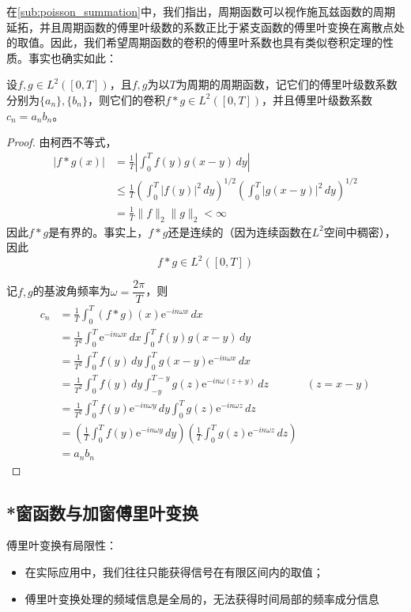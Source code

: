在\ref{sub:poisson_summation}中，我们指出，周期函数可以视作施瓦兹函数的周期延拓，并且周期函数的傅里叶级数的系数正比于紧支函数的傅里叶变换在离散点处的取值。因此，我们希望周期函数的卷积的傅里叶系数也具有类似卷积定理的性质。事实也确实如此：
\begin{theorem}[周期函数的卷积定理]
    设$f,g\in L^2([0,T])$，且$f,g$为以$T$为周期的周期函数，记它们的傅里叶级数系数分别为$\{a_n\},\{b_n\}$，则它们的卷积$f*g\in L^2([0,T])$，并且傅里叶级数系数$c_n=a_n b_n$。
\end{theorem}
\begin{proof}
    由柯西不等式，
    \begin{align*}
        |f*g(x)|&=\frac{1}{T}\left|\int_0^{T}f(y)g(x-y)\,dy\right|\\
        &\leq \frac{1}{T}\left(\int_0^{T}|f(y)|^2\,dy\right)^{1/2}\left(\int_0^{T}|g(x-y)|^2\,dy\right)^{1/2}\\
        &=\frac{1}{T}\|f\|_2\|g\|_2<\infty
    \end{align*}
    因此$f*g$是有界的。事实上，$f*g$还是连续的（因为连续函数在$L^2$空间中稠密），因此
    $$f*g\in L^2([0,T])$$

    记$f,g$的基波角频率为$\omega=\dfrac{2\pi}{T}$，则
    \begin{align*}
        c_n&=\frac{1}{T}\int_0^{T}(f*g)(x)\mathrm{e}^{-in\omega x}\,dx\\
        &=\frac{1}{T^2}\int_0^{T}\mathrm{e}^{-in\omega x}\,dx\int_0^{T}f(y)g(x-y)\,dy\\
        &=\frac{1}{T^2}\int_0^{T}f(y)\,dy\int_0^{T}g(x-y)\mathrm{e}^{-in\omega x}\,dx\\
        &=\frac{1}{T^2}\int_0^{T}f(y)\,dy\int_{-y}^{T-y}g(z)\mathrm{e}^{-in\omega (z+y)}\,dz&(z=x-y)\\
        &=\frac{1}{T^2}\int_0^{T}f(y)\mathrm{e}^{-in\omega y}\,dy\int_0^{T}g(z)\mathrm{e}^{-in\omega z}\,dz\\
        &=\left(\frac{1}{T}\int_0^{T}f(y)\mathrm{e}^{-in\omega y}\,dy\right)\left(\frac{1}{T}\int_0^{T}g(z)\mathrm{e}^{-in\omega z}\,dz\right)\\
        &=a_n b_n
    \end{align*}
\end{proof}

\subsection{*窗函数与加窗傅里叶变换}\label{sub:window}

傅里叶变换有局限性：\begin{itemize}
    \item 在实际应用中，我们往往只能获得信号在有限区间内的取值；
    \item 傅里叶变换处理的频域信息是全局的，无法获得时间局部的频率成分信息
\end{itemize}

